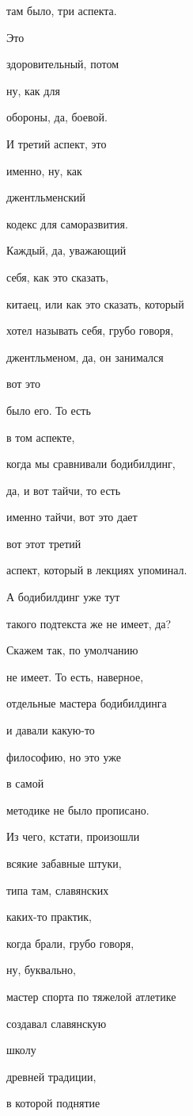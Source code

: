 там было, три аспекта.

Это

здоровительный, потом

ну, как для

обороны, да, боевой.

И третий аспект, это

именно, ну, как

джентльменский

кодекс для саморазвития.

Каждый, да, уважающий

себя, как это сказать,

китаец, или как это сказать, который

хотел называть себя, грубо говоря,

джентльменом, да, он занимался

вот это

было его. То есть

в том аспекте,

когда мы сравнивали бодибилдинг,

да, и вот тайчи, то есть

именно тайчи, вот это дает

вот этот третий

аспект, который в лекциях упоминал.

А бодибилдинг уже тут

такого подтекста же не имеет, да?

Скажем так, по умолчанию

не имеет. То есть, наверное,

отдельные мастера бодибилдинга

и давали какую-то

философию, но это уже

в самой

методике не было прописано.

Из чего, кстати, произошли

всякие забавные штуки,

типа там, славянских

каких-то практик,

когда брали, грубо говоря,

ну, буквально,

мастер спорта по тяжелой атлетике

создавал славянскую

школу

древней традиции,

в которой поднятие

